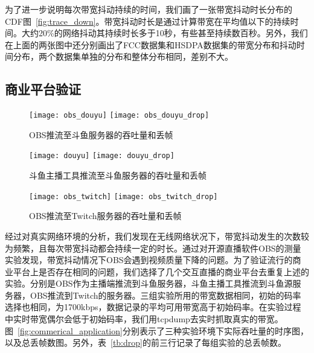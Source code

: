 为了进一步说明每次带宽抖动持续的时间，我们画了一张带宽抖动时长分布的CDF图~\ref{fig:trace_down}。带宽抖动时长是通过计算带宽在平均值以下的持续时间。大约20\%的网络抖动其持续时长多于10秒，有些甚至持续数百秒。另外，我们在上面的两张图中还分别画出了FCC数据集和HSDPA数据集的带宽分布和抖动时间分布，两个数据集单独的分布和整体分布相同，差别不大。

\subsection{商业平台验证}

\begin{figure*}[htb]
  \centering%
  \begin{subfigure}[b]{\textwidth}
    \texttt{[image: obs\_douyu]}
    \hfill
    \texttt{[image: obs\_douyu\_drop]}
    \caption{OBS推流至斗鱼服务器的吞吐量和丢帧}
    \label{fig:obs_douyu}
  \end{subfigure}
  \vfill
  \vspace{0.2in}
  \begin{subfigure}[b]{\textwidth}
    \texttt{[image: douyu]}
    \hfill
    \texttt{[image: douyu\_drop]}
    \caption{斗鱼主播工具推流至斗鱼服务器的吞吐量和丢帧}
    \label{fig:douyu}
  \end{subfigure}
  \vfill
  \vspace{0.2in}
  \begin{subfigure}[b]{\textwidth}
    \texttt{[image: obs\_twitch]}
    \hfill
    \texttt{[image: obs\_twitch\_drop]}
    \caption{OBS推流至Twitch服务器的吞吐量和丢帧}
    \label{fig:twitch}
  \end{subfigure}
  \caption{商业平台验证实验}
  \label{fig:commerical_application}
\end{figure*}


经过对真实网络环境的分析，我们发现在无线网络状况下，带宽抖动发生的次数较为频繁，且每次带宽抖动都会持续一定的时长。通过对开源直播软件OBS的测量实验发现，带宽抖动情况下OBS会遇到视频质量下降的问题。为了验证流行的商业平台上是否存在相同的问题，我们选择了几个交互直播的商业平台去重复上述的实验。分别是OBS作为主播端推流到斗鱼服务器，斗鱼主播工具推流到斗鱼源服务器，OBS推流到Twitch的服务器。三组实验所用的带宽数据相同，初始的码率选择也相同，为1700kbps，数据记录的平均可用带宽高于初始码率。在实验过程中实时带宽偶尔会低于初始码率，我们用tcpdump去实时抓取真实的带宽。图~\ref{fig:commerical_application}分别表示了三种实验环境下实际吞吐量的时序图，以及总丢帧数图。另外，表~\ref{tb:drop}的前三行记录了每组实验的总丢帧数。

